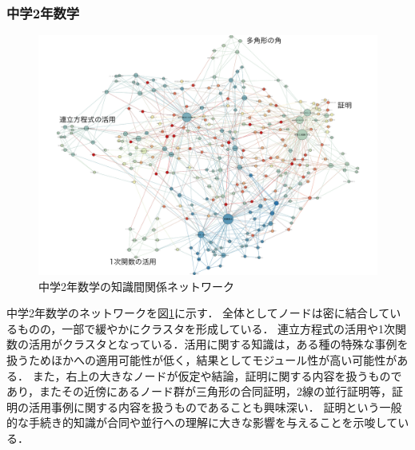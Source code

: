 \subsubsection{中学2年数学}
\begin{figure}[!htb]
\begin{center}
	\includegraphics[width=330pt]{./img/c2_mat_label2.pdf}
	\caption{中学2年数学の知識間関係ネットワーク}
	\label{fig:net_c2mat}
\end{center}
\end{figure}
中学2年数学のネットワークを図\ref{fig:net_c2mat}に示す．
全体としてノードは密に結合しているものの，一部で緩やかにクラスタを形成している．
連立方程式の活用や1次関数の活用がクラスタとなっている．活用に関する知識は，ある種の特殊な事例を扱うためほかへの適用可能性が低く，結果としてモジュール性が高い可能性がある．
また，右上の大きなノードが仮定や結論，証明に関する内容を扱うものであり，またその近傍にあるノード群が三角形の合同証明，2線の並行証明等，証明の活用事例に関する内容を扱うものであることも興味深い．
証明という一般的な手続き的知識が合同や並行への理解に大きな影響を与えることを示唆している．





